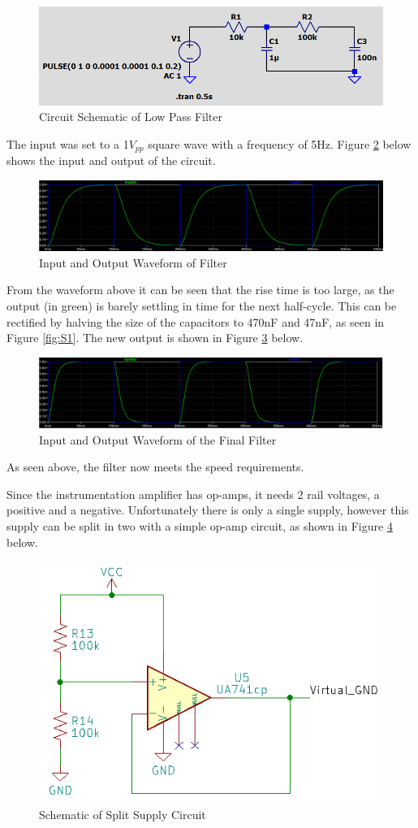 \documentclass[class=report,11pt,crop=false]{standalone}
\begin{document}
	\begin{figure}[h!]
		\centering
		\includegraphics[width=0.5\linewidth]{Figures/Filter.png}
		\caption{Circuit Schematic of Low Pass Filter}
		\label{fig:S2}
	\end{figure}
	
	The input was set to a 1$V_{pp}$ square wave with a frequency of 5Hz. Figure \ref{fig:S3} below shows the input and output of the circuit.
	
	\begin{figure}[h!]
		\centering
		\includegraphics[width=0.9\linewidth]{Figures/Filter Waveform.png}
		\caption{Input and Output Waveform of Filter}
		\label{fig:S3}
	\end{figure}
	
	From the waveform above it can be seen that the rise time is too large, as the output (in green) is barely settling in time for the next half-cycle. This can be rectified by halving the size of the capacitors to 470nF and 47nF, as seen in Figure \ref{fig:S1}. The new output is shown in Figure \ref{fig:S4} below.
	
	\begin{figure}[h!]
		\centering
		\includegraphics[width=0.9\linewidth]{Figures/Filter Waveform2.png}
		\caption{Input and Output Waveform of the Final Filter}
		\label{fig:S4}
	\end{figure}
	As seen above, the filter now meets the speed requirements.
	
	Since the instrumentation amplifier has op-amps, it needs 2 rail voltages, a positive and a negative. Unfortunately there is only a single supply, however this supply can be split in two with a simple op-amp circuit, as shown in Figure \ref{fig:S5} below.
	\begin{figure}[h!]
		\centering
		\includegraphics[width=0.5\linewidth]{Figures/Split Supply.png}
		\caption{Schematic of Split Supply Circuit}
		\label{fig:S5}
	\end{figure}
	
\end{document}
